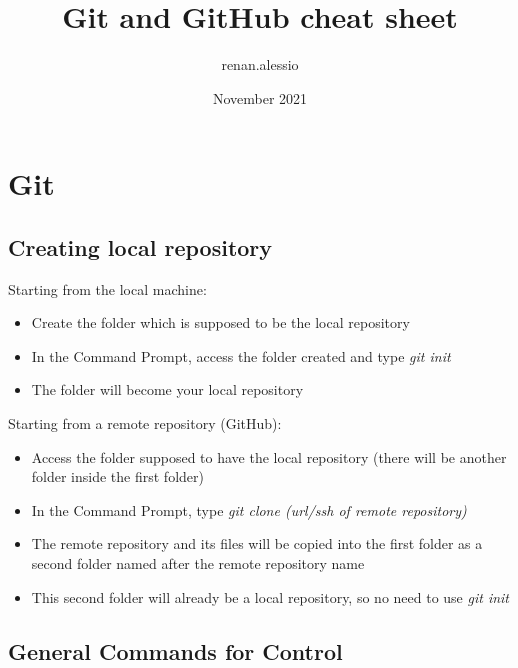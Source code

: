 \documentclass{article}
\title{Git and GitHub cheat sheet}
\author{renan.alessio }
\date{November 2021}
\begin{document}
\maketitle

\section{Git}

\subsection{Creating local repository}

Starting from the local machine:

\begin{itemize}
    \item Create the folder which is supposed to be the local repository
    \item In the Command Prompt, access the folder created and type \textit{git init}
    \item The folder will become your local repository
\end{itemize}

Starting from a remote repository (GitHub):

\begin{itemize}
    \item Access the folder supposed to have the local repository (there will be another folder inside the first folder)
    \item In the Command Prompt, type \textit{git clone (url/ssh of remote repository)}
    \item The remote repository and its files will be copied into the first folder as a second folder named after the remote repository name
    \item This second folder will already be a local repository, so no need to use \textit{git init}
\end{itemize}

\subsection{General Commands for Control}
\end{document}
